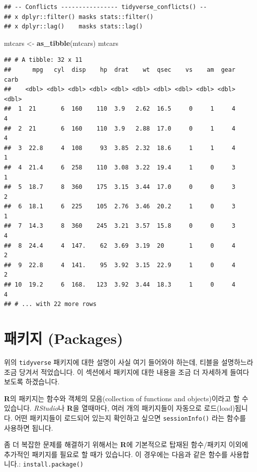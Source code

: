 \documentclass[]{book}
\newenvironment{Shaded}{\begin{snugshade}}{\end{snugshade}}
\newcommand{\KeywordTok}[1]{\textcolor[rgb]{0.13,0.29,0.53}{\textbf{#1}}}
\newcommand{\NormalTok}[1]{#1}
\newcommand{\StringTok}[1]{\textcolor[rgb]{0.31,0.60,0.02}{#1}}
\begin{document}
\begin{verbatim}
## -- Conflicts ---------------- tidyverse_conflicts() --
## x dplyr::filter() masks stats::filter()
## x dplyr::lag()    masks stats::lag()
\end{verbatim}

\begin{Shaded}
\begin{Highlighting}[]
\NormalTok{mtcars <-}\StringTok{ }\KeywordTok{as_tibble}\NormalTok{(mtcars)}
\NormalTok{mtcars}
\end{Highlighting}
\end{Shaded}

\begin{verbatim}
## # A tibble: 32 x 11
##      mpg   cyl  disp    hp  drat    wt  qsec    vs    am  gear  carb
##    <dbl> <dbl> <dbl> <dbl> <dbl> <dbl> <dbl> <dbl> <dbl> <dbl> <dbl>
##  1  21       6  160    110  3.9   2.62  16.5     0     1     4     4
##  2  21       6  160    110  3.9   2.88  17.0     0     1     4     4
##  3  22.8     4  108     93  3.85  2.32  18.6     1     1     4     1
##  4  21.4     6  258    110  3.08  3.22  19.4     1     0     3     1
##  5  18.7     8  360    175  3.15  3.44  17.0     0     0     3     2
##  6  18.1     6  225    105  2.76  3.46  20.2     1     0     3     1
##  7  14.3     8  360    245  3.21  3.57  15.8     0     0     3     4
##  8  24.4     4  147.    62  3.69  3.19  20       1     0     4     2
##  9  22.8     4  141.    95  3.92  3.15  22.9     1     0     4     2
## 10  19.2     6  168.   123  3.92  3.44  18.3     1     0     4     4
## # ... with 22 more rows
\end{verbatim}

\hypertarget{uxd328uxd0a4uxc9c0-packages}{%
\section{패키지 (Packages)}\label{uxd328uxd0a4uxc9c0-packages}}

위의 \texttt{tidyverse} 패키지에 대한 설명이 사실 여기 들어와야 하는데, 티블을 설명하느라 조금 당겨서 적었습니다. 이 섹션에서 패키지에 대한 내용을 조금 더 자세하게 들여다 보도록 하겠습니다.

\textbf{R}의 패키지는 함수와 객체의 모음(collection of functions and objects)이라고 할 수 있습니다. \emph{RStudio}나 \textbf{R}을 열때마다, 여러 개의 패키지들이 자동으로 로드(load)됩니다. 어떤 패키지들이 로드되어 있는지 확인하고 싶으면 \texttt{sessionInfo()} 라는 함수를 사용하면 됩니다.

좀 더 복잡한 문제를 해결하기 위해서는 \textbf{R}에 기본적으로 탑재된 함수/패키지 이외에 추가적인 패키지를 필요로 할 때가 있습니다. 이 경우에는 다음과 같은 함수를 사용합니다.: \texttt{install.package()}
\end{document}
